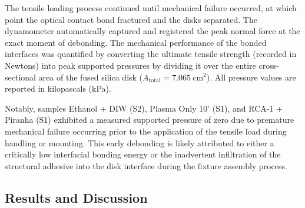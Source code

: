 The tensile loading process continued until mechanical failure occurred, at
which point the optical contact bond fractured and the disks separated. The
dynamometer automatically captured and registered the peak normal force at the
exact moment of debonding. The mechanical performance of the bonded interfaces was quantified by converting 
the ultimate tensile strength (recorded in Newtons) into peak supported 
pressures by dividing it over the entire cross-sectional area of the fused silica disk 
($A_{\text{total}} = \SI{7.065}{\centi\meter\squared}$). All pressure 
values are reported in kilopascals (kPa).

Notably, samples Ethanol + DIW (S2), Plasma Only 10' (S1), and RCA-1 + 
Piranha (S1) exhibited a measured supported pressure of zero due to 
premature mechanical failure occurring prior to the application of the 
tensile load during handling or mounting. This early debonding is likely 
attributed to either a critically low interfacial bonding energy or the 
inadvertent infiltration of the structural adhesive into the disk 
interface during the fixture assembly process.
\subsection{Results and Discussion}
\label{sec:results_discussion}

